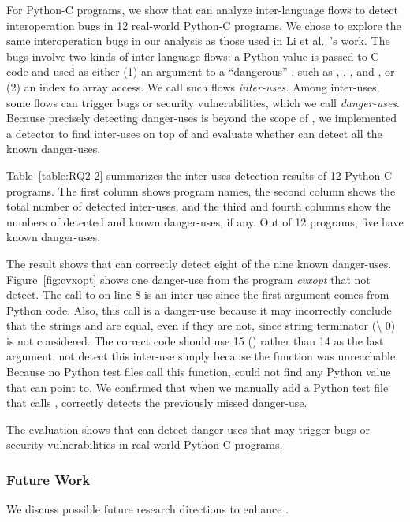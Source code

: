 For Python-C programs, we show that \ours can analyze inter-language flows to
detect interoperation bugs in 12 real-world Python-C programs.  We chose to
explore the same interoperation bugs in our analysis as those used in Li et
al.~\cite{polycruise}'s work.  The bugs involve two kinds of inter-language
flows: a Python value is passed to C code and used as either (1) an argument to
a ``dangerous'' , such as , ,
, and , or (2) an index to array access.  We call
such flows \textit{inter-uses}.  Among inter-uses, some flows can trigger bugs
or security vulnerabilities, which we call \textit{danger-uses}.  Because
precisely detecting danger-uses is beyond the scope of \ours, we implemented a
detector to find inter-uses on top of \ours and evaluate whether \ours can
detect all the known danger-uses.

Table~\ref{table:RQ2-2} summarizes the inter-uses detection results of 12
Python-C programs.  The first column shows program names, the second column
shows the total number of detected inter-uses, and the third and fourth columns
show the numbers of detected and known danger-uses, if any.  Out of 12
programs, five have known danger-uses.

The result shows that \ours can correctly detect eight of the nine known
danger-uses.  Figure~\ref{fig:cvxopt} shows one danger-use from the program
{\it cvxopt} that \ours {} not detect.  The call to  on line
8 is an inter-use since the first argument  comes from Python
code.  Also, this call is a danger-use because it may incorrectly conclude that
the strings  and  are equal, even if they
are not, since string terminator (\textquotesingle \textbackslash
0\textquotesingle) is not considered.  The correct code should use 15
() rather than 14 as the last argument.
\ours {} not detect this inter-use simply because the function
 was unreachable.  Because no Python test files call this
function, \ours could not find any Python value that  can point
to. We confirmed that when we manually add a Python test file that calls
, \ours correctly detects the previously missed danger-use.

The evaluation shows that \ours can detect danger-uses that may
trigger bugs or security vulnerabilities in real-world Python-C programs.

\subsubsection{Future Work}
We discuss possible future research directions to enhance \ours.

